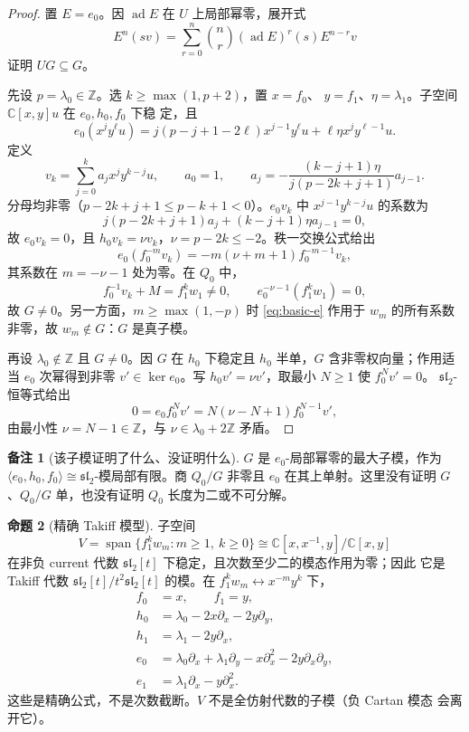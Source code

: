 \documentclass[UTF8,11pt]{ctexart}
\newcommand{\C}{\mathbb C}
\newcommand{\Z}{\mathbb Z}
\newcommand{\slc}{\mathfrak{sl}_2}
\newcommand{\ad}{\operatorname{ad}}
\newcommand{\Span}{\operatorname{span}}
\theoremstyle{definition}
\newtheorem{proposition}{命题}[section]
\newtheorem{remark}[proposition]{备注}
\begin{document}
\begin{proof}
置 \(E=e_0\)。因 \(\ad E\) 在 \(U\) 上局部幂零，展开式
\[
E^n(sv)=\sum_{r=0}^n\binom nr(\ad E)^r(s)E^{n-r}v
\]
证明 \(UG\subseteq G\)。

先设 \(p=\lambda_0\in\Z\)。选 \(k\ge\max(1,p+2)\)，置 \(x=f_0\)、
\(y=f_1\)、\(\eta=\lambda_1\)。子空间 \(\C[x,y]u\) 在 \(e_0,h_0,f_0\) 下稳
定，且
\begin{equation}\label{eq:polynomial-e}
e_0(x^jy^\ell u)
=j(p-j+1-2\ell)x^{j-1}y^\ell u+\ell\eta x^jy^{\ell-1}u.
\end{equation}
定义
\[
v_k=\sum_{j=0}^k a_jx^jy^{k-j}u,\qquad a_0=1,\qquad
a_j=-\frac{(k-j+1)\eta}{j(p-2k+j+1)}a_{j-1}.
\]
分母均非零（\(p-2k+j+1\le p-k+1<0\)）。\(e_0v_k\) 中
\(x^{j-1}y^{k-j}u\) 的系数为
\[
j(p-2k+j+1)a_j+(k-j+1)\eta a_{j-1}=0,
\]
故 \(e_0v_k=0\)，且 \(h_0v_k=\nu v_k\)，\(\nu=p-2k\le-2\)。秩一交换公式给出
\[
e_0(f_0^{-m}v_k)=-m(\nu+m+1)f_0^{-m-1}v_k,
\]
其系数在 \(m=-\nu-1\) 处为零。在 \(Q_0\) 中，
\[
f_0^{-1}v_k+M=f_1^kw_1\ne0,\qquad
e_0^{-\nu-1}(f_1^kw_1)=0,
\]
故 \(G\ne0\)。另一方面，\(m\ge\max(1,-p)\) 时 \eqref{eq:basic-e} 作用于
\(w_m\) 的所有系数非零，故 \(w_m\notin G\)：\(G\) 是真子模。

再设 \(\lambda_0\notin\Z\) 且 \(G\ne0\)。因 \(G\) 在 \(h_0\) 下稳定且 \(h_0\)
半单，\(G\) 含非零权向量；作用适当 \(e_0\) 次幂得到非零
\(v'\in\ker e_0\)。写 \(h_0v'=\nu v'\)，取最小 \(N\ge1\) 使 \(f_0^Nv'=0\)。
\(\slc\)-恒等式给出
\[
0=e_0f_0^Nv'=N(\nu-N+1)f_0^{N-1}v',
\]
由最小性 \(\nu=N-1\in\Z\)，与 \(\nu\in\lambda_0+2\Z\) 矛盾。
\end{proof}

\begin{remark}[该子模证明了什么、没证明什么]\label{rem:G}
\(G\) 是 \(e_0\)-局部幂零的最大子模，作为
\(\langle e_0,h_0,f_0\rangle\cong\slc\)-模局部有限。商 \(Q_0/G\) 非零且
\(e_0\) 在其上单射。这里没有证明 \(G\)、\(Q_0/G\) 单，也没有证明
\(Q_0\) 长度为二或不可分解。
\end{remark}

\begin{proposition}[精确 Takiff 模型]\label{prop:takiff}
子空间
\[
V=\Span\{f_1^kw_m:m\ge1,\ k\ge0\}
\cong\C[x,x^{-1},y]/\C[x,y]
\]
在非负 current 代数 \(\slc[t]\) 下稳定，且次数至少二的模态作用为零；因此
它是 Takiff 代数 \(\slc[t]/t^2\slc[t]\) 的模。在
\(f_1^kw_m\leftrightarrow x^{-m}y^k\) 下，
\begin{align*}
f_0&=x,\qquad f_1=y,\\
h_0&=\lambda_0-2x\partial_x-2y\partial_y,\\
h_1&=\lambda_1-2y\partial_x,\\
e_0&=\lambda_0\partial_x+\lambda_1\partial_y
      -x\partial_x^2-2y\partial_x\partial_y,\\
e_1&=\lambda_1\partial_x-y\partial_x^2.
\end{align*}
这些是精确公式，不是次数截断。\(V\) 不是全仿射代数的子模（负 Cartan 模态
会离开它）。
\end{proposition}
\end{document}
